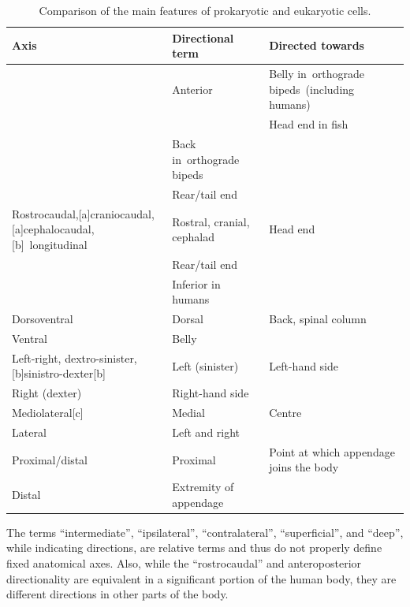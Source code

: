\begin{longtable}[t]{>{\raggedright\arraybackslash}p{30em}>{\raggedright\arraybackslash}p{10em}>{\raggedright\arraybackslash}p{10em}}
\caption{\label{tab:axes}Comparison of the main features of prokaryotic and eukaryotic cells.}\\
\toprule
Axis & Directional term & Directed towards\\
\midrule
\rowcolor{gray!6}   & Anterior & Belly in orthograde bipeds (including humans)\\

\multirow{-2}{30em}{\raggedright\arraybackslash Anteroposterior} &  & Head end in fish\\
\cmidrule{1-3}
\rowcolor{gray!6}   & Back in orthograde bipeds & \\

\multirow{-2}{30em}{\raggedright\arraybackslash Posterior} & Rear/tail end & \\
\cmidrule{1-3}
\rowcolor{gray!6}  Rostrocaudal,[a]craniocaudal,[a]cephalocaudal,[b] longitudinal & Rostral, cranial, cephalad & Head end\\
\cmidrule{1-3}
 & Rear/tail end & \\

\rowcolor{gray!6}  \multirow{-2}{30em}{\raggedright\arraybackslash Caudal} & Inferior in humans & \\
\cmidrule{1-3}
Dorsoventral & Dorsal & Back, spinal column\\
\cmidrule{1-3}
\rowcolor{gray!6}  Ventral & Belly & \\
\cmidrule{1-3}
Left-right, dextro-sinister,[b]sinistro-dexter[b] & Left (sinister) & Left-hand side\\
\cmidrule{1-3}
\rowcolor{gray!6}  Right (dexter) & Right-hand side & \\
\cmidrule{1-3}
Mediolateral[c] & Medial & Centre\\
\cmidrule{1-3}
\rowcolor{gray!6}  Lateral & Left and right & \\
\cmidrule{1-3}
Proximal/distal & Proximal & Point at which appendage joins the body\\
\cmidrule{1-3}
\rowcolor{gray!6}  Distal & Extremity of appendage & \\
\bottomrule
\end{longtable}

The terms ``intermediate'', ``ipsilateral'', ``contralateral'', ``superficial'', and ``deep'', while indicating directions, are relative terms and thus do not properly define fixed anatomical axes. Also, while the ``rostrocaudal'' and anteroposterior directionality are equivalent in a significant portion of the human body, they are different directions in other parts of the body.

